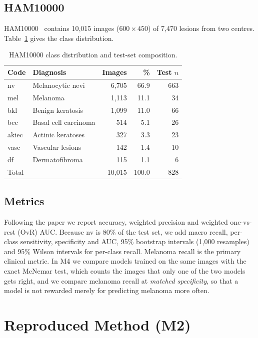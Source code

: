 \documentclass[conference]{IEEEtran}
\begin{document}
\subsection{HAM10000}
HAM10000~\cite{tschandl2018} contains 10,015 images ($600\times450$) of 7,470 lesions from two centres. Table~\ref{tab:classes} gives the class distribution.

\begin{table}[t]
\caption{HAM10000 class distribution and test-set composition.}
\label{tab:classes}
\centering
\begin{tabular}{llrrr}
\toprule
Code & Diagnosis & Images & \% & Test $n$\\
\midrule
nv & Melanocytic nevi & 6,705 & 66.9 & 663\\
mel & Melanoma & 1,113 & 11.1 & 34\\
bkl & Benign keratosis & 1,099 & 11.0 & 66\\
bcc & Basal cell carcinoma & 514 & 5.1 & 26\\
akiec & Actinic keratoses & 327 & 3.3 & 23\\
vasc & Vascular lesions & 142 & 1.4 & 10\\
df & Dermatofibroma & 115 & 1.1 & 6\\
\midrule
\multicolumn{2}{l}{Total} & 10,015 & 100.0 & 828\\
\bottomrule
\end{tabular}
\end{table}

\subsection{Metrics}
Following the paper we report accuracy, weighted precision and weighted one-vs-rest (OvR) AUC. Because nv is 80\% of the test set, we add macro recall, per-class sensitivity, specificity and AUC, 95\% bootstrap intervals (1,000 resamples) and 95\% Wilson intervals for per-class recall. Melanoma recall is the primary clinical metric. In M4 we compare models trained on the same images with the exact McNemar test, which counts the images that only one of the two models gets right, and we compare melanoma recall at \emph{matched specificity}, so that a model is not rewarded merely for predicting melanoma more often.

\section{Reproduced Method (M2)}\label{sec:method}
\end{document}
